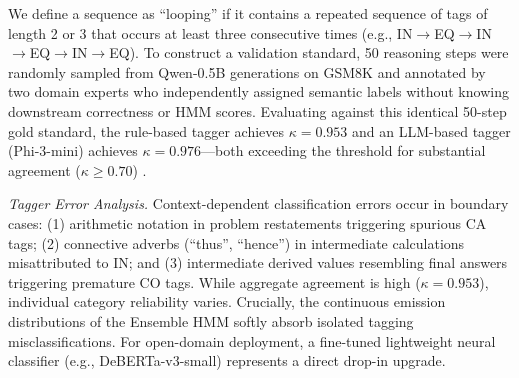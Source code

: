 \documentclass[conference]{IEEEtran}
\begin{document}
We define a sequence as ``looping'' if it contains a repeated sequence of tags of length 2 or 3 that occurs at least three consecutive times (e.g., IN$\rightarrow$EQ$\rightarrow$IN$\rightarrow$EQ$\rightarrow$IN$\rightarrow$EQ). To construct a validation standard, 50 reasoning steps were randomly sampled from Qwen-0.5B generations on GSM8K and annotated by two domain experts who independently assigned semantic labels without knowing downstream correctness or HMM scores. Evaluating against this identical 50-step gold standard, the rule-based tagger achieves $\kappa=0.953$ and an LLM-based tagger (Phi-3-mini) achieves $\kappa=0.976$---both exceeding the threshold for substantial agreement ($\kappa\ge0.70$) \cite{landis1977measurement}.

\textit{Tagger Error Analysis.} Context-dependent classification errors occur in boundary cases: (1) arithmetic notation in problem restatements triggering spurious CA tags; (2) connective adverbs (``thus'', ``hence'') in intermediate calculations misattributed to IN; and (3) intermediate derived values resembling final answers triggering premature CO tags. While aggregate agreement is high ($\kappa=0.953$), individual category reliability varies. Crucially, the continuous emission distributions of the Ensemble HMM softly absorb isolated tagging misclassifications. For open-domain deployment, a fine-tuned lightweight neural classifier (e.g., DeBERTa-v3-small) represents a direct drop-in upgrade.

\begin{table}[htbp]
\caption{Semantic Tag Vocabulary and Lexical / Pattern Cues}
\label{tab:tags}
\begin{center}
\end{center}
\end{table}
\end{document}
